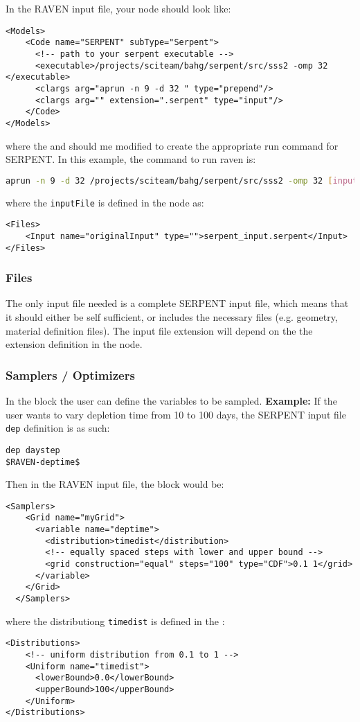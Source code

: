 In the RAVEN input file, your  node should look like:
\begin{lstlisting}[style=XML]
<Models>
    <Code name="SERPENT" subType="Serpent">
      <!-- path to your serpent executable -->
      <executable>/projects/sciteam/bahg/serpent/src/sss2 -omp 32 </executable>
      <clargs arg="aprun -n 9 -d 32 " type="prepend"/>
      <clargs arg="" extension=".serpent" type="input"/>
    </Code>
</Models>
\end{lstlisting}
where the  and  should me modified
to create the appropriate run command for SERPENT. In this example, the command
to run raven is:
\begin{lstlisting}[language=bash]
aprun -n 9 -d 32 /projects/sciteam/bahg/serpent/src/sss2 -omp 32 [inputFile]
\end{lstlisting}
where the \texttt{inputFile} is defined in the  node as:
\begin{lstlisting}[style=XML]
<Files>
    <Input name="originalInput" type="">serpent_input.serpent</Input>
</Files>
\end{lstlisting}

\subsubsection{Files}
The only input file needed is a complete SERPENT input file,
which means that it should either be self sufficient, or includes
the necessary files (e.g. geometry, material definition files).
The input file extension will depend on the the extension definition
in the  node.

\subsubsection{Samplers / Optimizers}
In the  block the user can define the variables
to be sampled.
\textbf{Example:} If the user wants to vary depletion time from
10 to 100 days, the SERPENT input file \texttt{dep} definition is as such:
\begin{lstlisting}
dep daystep 
$RAVEN-deptime$ 
\end{lstlisting}

Then in the RAVEN input file, the  block would be:
\begin{lstlisting}[style=XML]
  <Samplers>
    <Grid name="myGrid">
      <variable name="deptime">
        <distribution>timedist</distribution>
        <!-- equally spaced steps with lower and upper bound -->
        <grid construction="equal" steps="100" type="CDF">0.1 1</grid>
      </variable>
    </Grid>
  </Samplers>
\end{lstlisting}
where the distributiong \texttt{timedist} is defined in the :
\begin{lstlisting}[style=XML]
  <Distributions>
    <!-- uniform distribution from 0.1 to 1 -->
    <Uniform name="timedist">
      <lowerBound>0.0</lowerBound>
      <upperBound>100</upperBound>
    </Uniform>
</Distributions>
\end{lstlisting}

